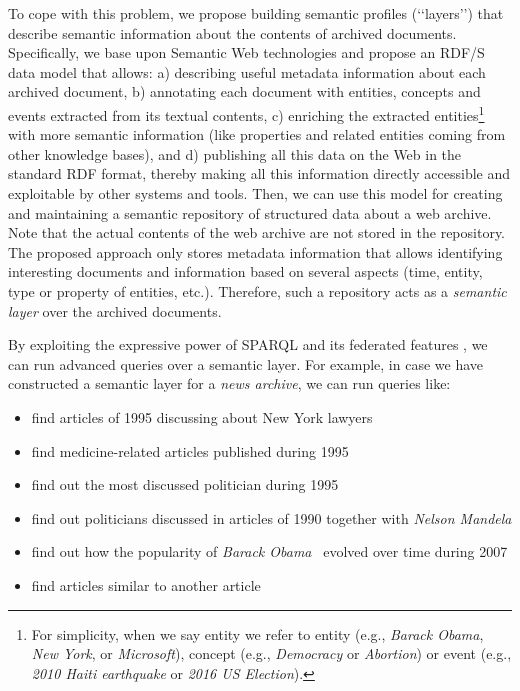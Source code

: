 \documentclass[twocolumn]{svjour3}
\newcommand{\q}[1]{\lq\lq{}{}#1\rq\rq{}{}}
\begin{document}
To cope with this problem,
we propose building semantic profiles (\q{layers}) that describe semantic information about
the contents of archived documents.
Specifically, we base upon Semantic Web technologies and
propose an RDF/S \cite{brickley2014rdf} data model that allows:
a) describing useful metadata information about each archived document,
b) annotating each document with entities, concepts and events
extracted from its textual contents,
c) enriching the extracted entities\footnote{For simplicity,
when we say entity we refer to entity
(e.g., {\em Barack Obama}, {\em New York}, or {\em Microsoft}), concept (e.g., {\em Democracy} or {\em Abortion})
or event (e.g., {\em 2010 Haiti earthquake} or {\em 2016 US Election}).}
with more semantic information (like properties and related entities coming from
other knowledge bases), and
d) publishing all this data on the Web in the standard RDF format,
thereby making all this information directly accessible and exploitable by other systems and tools.
Then, we can use this model for creating and maintaining a semantic repository
of structured data about a web archive.
Note that the actual contents of the web archive are not
stored in the repository.
The proposed approach only stores metadata information
that allows identifying interesting documents and information based on
several aspects (time, entity, type or property of entities, etc.).
Therefore, such a repository acts as a {\em semantic layer} over the archived documents.

By exploiting the expressive power of SPARQL \cite{prud2008sparql}
and its federated features
\cite{prud2013sparql,fafalios2016querying}, we can run advanced
queries over a semantic layer. For example, in case we have
constructed a semantic layer for a {\em news archive}, we can run
queries like:

\begin{itemize}
\item find articles of 1995 discussing about New York lawyers
\item find medicine-related articles published during 1995
\item find out the most discussed politician during 1995
\item find out politicians discussed in articles of 1990 together with {\em Nelson Mandela}
\item find out how the popularity of {\em Barack Obama}~ evolved over time during 2007
\item find articles similar to another article
\end{itemize}
\end{document}
